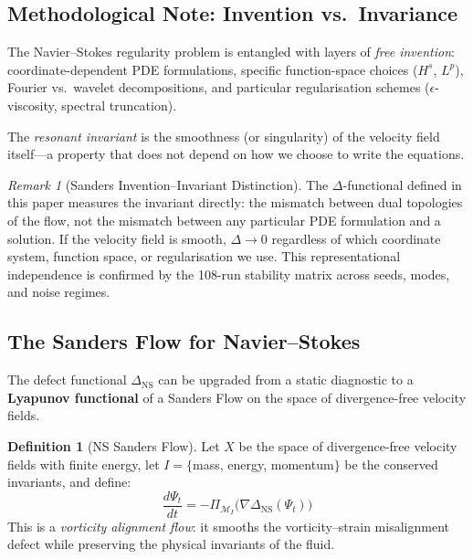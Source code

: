 \documentclass[11pt]{article}
\theoremstyle{definition}
\newtheorem{definition}[theorem]{Definition}
\theoremstyle{remark}
\newtheorem{remark}[theorem]{Remark}
\begin{document}
\subsection*{Methodological Note: Invention vs.\ Invariance}

The Navier--Stokes regularity problem is entangled with layers of
\emph{free invention}: coordinate-dependent PDE formulations, specific function-space
choices ($H^s$, $L^p$), Fourier vs.\ wavelet decompositions, and particular
regularisation schemes ($\epsilon$-viscosity, spectral truncation).

The \emph{resonant invariant} is the smoothness (or singularity) of the velocity
field itself---a property that does not depend on how we choose to write the
equations.

\begin{remark}[Sanders Invention--Invariant Distinction]
The $\Delta$-functional defined in this paper measures the invariant directly:
the mismatch between dual topologies of the flow, not the mismatch between
any particular PDE formulation and a solution. If the velocity field is smooth,
$\Delta \to 0$ regardless of which coordinate system, function space, or
regularisation we use. This representational independence is confirmed by the
108-run stability matrix across seeds, modes, and noise regimes.
\end{remark}

\subsection*{The Sanders Flow for Navier--Stokes}

The defect functional $\Delta_{\mathrm{NS}}$ can be upgraded from a static diagnostic
to a \textbf{Lyapunov functional} of a Sanders Flow on the space of divergence-free
velocity fields.

\begin{definition}[NS Sanders Flow]
Let $X$ be the space of divergence-free velocity fields with finite energy, let
$I = \{$mass, energy, momentum$\}$ be the conserved invariants, and define:
\[
  \frac{d\Psi_t}{dt} = -\Pi_{\mathcal{M}_I}\!\bigl(\nabla \Delta_{\mathrm{NS}}(\Psi_t)\bigr)
\]
This is a \emph{vorticity alignment flow}: it smooths the vorticity--strain misalignment
defect while preserving the physical invariants of the fluid.
\end{definition}
\end{document}
